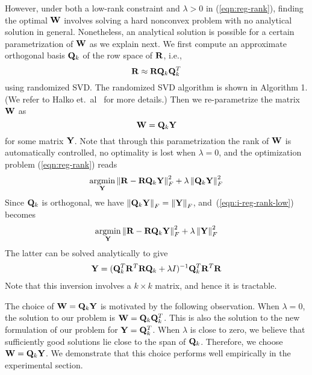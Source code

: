 %



However, under both a low-rank constraint and $\lambda > 0$ in (\ref{eqn:reg-rank}), finding the optimal $\mathbf{W}$ involves solving a hard nonconvex problem with no analytical solution in general. Nonetheless, an analytical solution is possible for a certain parametrization of $\mathbf{W}$ as we explain next. We first compute an approximate orthogonal basis $\mathbf{Q}_k$ of the row space of $\mathbf{R}$, i.e.,
\begin{equation}
\mathbf{R} \approx \mathbf{R} \mathbf{Q}_k \mathbf{Q}_k^T
\end{equation}
using randomized SVD. The randomized SVD algorithm is shown in Algorithm 1. (We refer to Halko et.~al~\citep{halko2011} for more details.)
Then we re-parametrize the matrix $\mathbf{W}$ as 
\begin{equation}
\mathbf{W} = \mathbf{Q}_k \mathbf{Y}
\end{equation}
for some matrix $\mathbf{Y}$. Note that through this parametrization the rank of $\mathbf{W}$ is automatically controlled, no optimality is lost when $\lambda=0$, and the optimization problem (\ref{eqn:reg-rank}) reads
\begin{align}
\label{eqn:i-reg-rank-low}
\underset{\mathbf{Y}} {\mathrm{argmin}}  \left \| \mathbf{R} - \mathbf{R} \mathbf{Q}_k \mathbf{Y} \right \|_F^2 + \lambda \left \|  \mathbf{Q}_k \mathbf{Y} \right \|_F^2 
\end{align}
Since $\mathbf{Q}_k$ is orthogonal, we have $\left \| \mathbf{Q}_k \mathbf{Y} \right \|_F = \left \|\mathbf{Y}\right \|_F$, and~(\ref{eqn:i-reg-rank-low}) becomes 
\begin{align}
\underset{\mathbf{Y}}{\mathrm{argmin}} \left \| \mathbf{R} - \mathbf{R}\mathbf{Q}_k\mathbf{Y}\right \|_F^2 + \lambda \left \|  \mathbf{Y} \right \|_F^2 
\end{align}
The latter can be solved analytically to give 
\begin{align*}
\mathbf{Y} = (\mathbf{Q}_k^T \mathbf{R}^T\mathbf{R}\mathbf{Q}_k +\lambda I)^{-1} \mathbf{Q}_k^T \mathbf{R}^T \mathbf{R}
\end{align*}
Note that this inversion involves a $k \times k$ matrix, and hence it is tractable.


The choice of $\mathbf{W} = \mathbf{Q}_k \mathbf{Y}$ is motivated by the following observation. When $\lambda = 0$, the solution to our problem is $\mathbf{W} = \mathbf{Q}_k \mathbf{Q}_k^T$. This is also the solution to the new formulation of our problem for $\mathbf{Y} = \mathbf{Q}_k^T$. When $\lambda$ is close to zero, we believe that sufficiently good solutions lie close to the span of $\mathbf{Q}_k$. Therefore, we choose $\mathbf{W} = \mathbf{Q}_k \mathbf{Y}$. We demonstrate that this choice performs well empirically in the experimental section.
 
